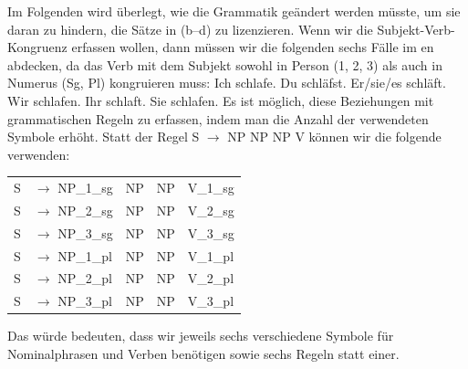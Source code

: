 Im Folgenden wird überlegt, wie die Grammatik geändert werden müsste, um sie daran zu hindern, die Sätze in (b--d) zu lizenzieren.
Wenn wir die Subjekt-Verb-Kongruenz erfassen wollen, dann müssen wir die folgenden sechs Fälle im en abdecken, da das Verb mit dem
Subjekt sowohl in Person (1, 2, 3) als auch in Numerus (Sg, Pl) kongruieren muss:
\eal\jamwidth=7cm\relax%
\ex
Ich schlafe. 
\ex
Du schläfst. 
\ex
Er/sie/es schläft. 
\ex
Wir schlafen. 
\ex
Ihr schlaft. 
\ex
Sie schlafen. 
\zl
Es ist möglich, diese Beziehungen mit grammatischen Regeln zu erfassen, indem man
die Anzahl der verwendeten Symbole erhöht. Statt der Regel S $\to$ NP NP NP V können wir
die folgende verwenden:
\ea
\begin{tabular}[t]{@{}l@{ }l@{~~}l@{~~}l@{~~}l}
S  & $\to$ NP\_1\_sg & NP & NP & V\_1\_sg\\
S  & $\to$ NP\_2\_sg & NP & NP & V\_2\_sg\\
S  & $\to$ NP\_3\_sg & NP & NP & V\_3\_sg\\
S  & $\to$ NP\_1\_pl & NP & NP & V\_1\_pl\\
S  & $\to$ NP\_2\_pl & NP & NP & V\_2\_pl\\
S  & $\to$ NP\_3\_pl & NP & NP & V\_3\_pl\\
\end{tabular}
\z
Das würde bedeuten, dass wir jeweils sechs verschiedene Symbole für Nominalphrasen und Verben benötigen sowie sechs Regeln statt einer.

